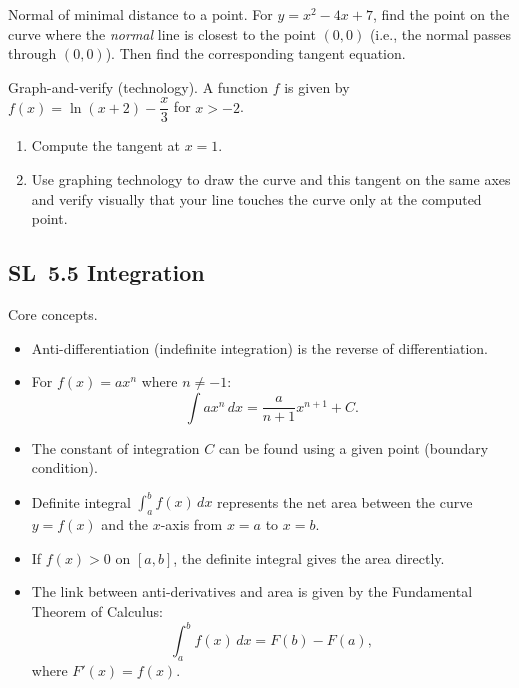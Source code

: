 \documentclass[11pt]{article}
\def\textbf#1{#1}%
\newcommand{\tocsubsection}[1]{\subsection{#1}}
\newcounter{question}
\begin{document}
\begin{question}
\textbf{Normal of minimal distance to a point.}
For $y=x^2-4x+7$, find the point on the curve where the \emph{normal} line is closest to the point $(0,0)$ (i.e., the normal passes through $(0,0)$). Then find the corresponding tangent equation.
\end{question}

\begin{question}
\textbf{Graph-and-verify (technology).}
A function $f$ is given by $f(x)=\ln(x+2)-\dfrac{x}{3}$ for $x>-2$.
\begin{enumerate}
  \item Compute the tangent at $x=1$.
  \item Use graphing technology to draw the curve and this tangent on the same axes and verify visually that your line touches the curve only at the computed point.
\end{enumerate}
\end{question}




\tocsubsection{SL 5.5 \; Integration}

\begin{keyideas}
\textbf{Core concepts.}
\begin{itemize}[itemsep=2pt]
  \item \textbf{Anti-differentiation} (indefinite integration) is the reverse of differentiation.
  \item For \(f(x) = ax^n\) where \(n \neq -1\):
    \[
    \int ax^n \, dx = \frac{a}{n+1} x^{n+1} + C.
    \]
  \item The \textbf{constant of integration} \(C\) can be found using a given point (boundary condition).
  \item \textbf{Definite integral} \(\int_a^b f(x) \, dx\) represents the net area between the curve \(y=f(x)\) and the \(x\)-axis from \(x=a\) to \(x=b\).
  \item If \(f(x) > 0\) on \([a,b]\), the definite integral gives the area directly.
  \item The link between \textbf{anti-derivatives} and \textbf{area} is given by the \textbf{Fundamental Theorem of Calculus}:
    \[
    \int_a^b f(x) \, dx = F(b) - F(a),
    \]
    where \(F'(x) = f(x)\).
\end{itemize}
\end{keyideas}
\end{document}
